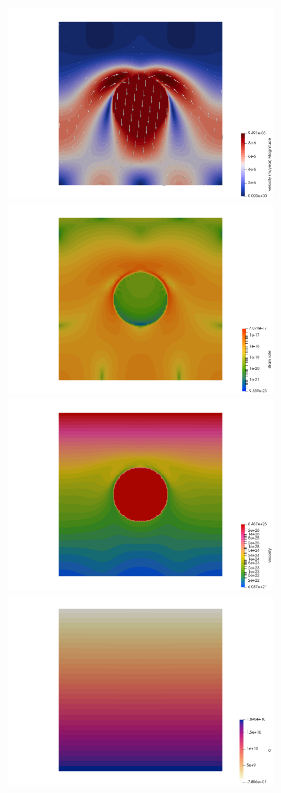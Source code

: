 \begin{center}
\includegraphics[width=7cm]{python_codes/fieldstone_87/results/experiment_06/vel.png}
\includegraphics[width=7cm]{python_codes/fieldstone_87/results/experiment_06/sr.png}\\
\includegraphics[width=7cm]{python_codes/fieldstone_87/results/experiment_06/eta.png}
\includegraphics[width=7cm]{python_codes/fieldstone_87/results/experiment_06/p.png}
\end{center}

